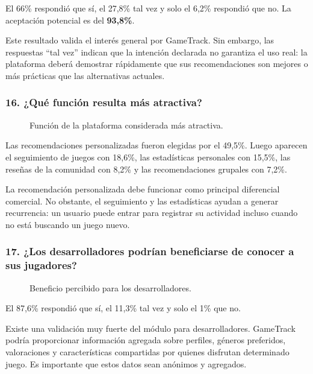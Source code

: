 El 66\% respondió que sí, el 27,8\% tal vez y solo el 6,2\% respondió que no. La aceptación potencial es del \textbf{93,8\%}.

Este resultado valida el interés general por GameTrack. Sin embargo, las respuestas \enquote{tal vez} indican que la intención declarada no garantiza el uso real: la plataforma deberá demostrar rápidamente que sus recomendaciones son mejores o más prácticas que las alternativas actuales.

\subsubsection*{16. ¿Qué función resulta más atractiva?}

\begin{figure}[H]
	\centering
	\caption{Función de la plataforma considerada más atractiva.}
	\label{fig:enc-p16}
\end{figure}

Las recomendaciones personalizadas fueron elegidas por el 49,5\%. Luego aparecen el seguimiento de juegos con 18,6\%, las estadísticas personales con 15,5\%, las reseñas de la comunidad con 8,2\% y las recomendaciones grupales con 7,2\%.

La recomendación personalizada debe funcionar como principal diferencial comercial. No obstante, el seguimiento y las estadísticas ayudan a generar recurrencia: un usuario puede entrar para registrar su actividad incluso cuando no está buscando un juego nuevo.

\subsubsection*{17. ¿Los desarrolladores podrían beneficiarse de conocer a sus jugadores?}

\begin{figure}[H]
	\centering
	\caption{Beneficio percibido para los desarrolladores.}
	\label{fig:enc-p17}
\end{figure}

El 87,6\% respondió que sí, el 11,3\% tal vez y solo el 1\% que no.

Existe una validación muy fuerte del módulo para desarrolladores. GameTrack podría proporcionar información agregada sobre perfiles, géneros preferidos, valoraciones y características compartidas por quienes disfrutan determinado juego. Es importante que estos datos sean anónimos y agregados.


